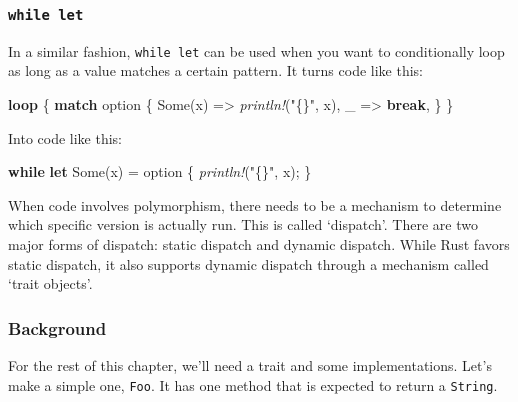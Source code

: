 \documentclass[a4paper,]{book}
\newenvironment{Shaded}{\begin{snugshade}}{\end{snugshade}}
\newcommand{\KeywordTok}[1]{\textcolor[rgb]{0.13,0.29,0.53}{\textbf{{#1}}}}
\newcommand{\ConstantTok}[1]{\textcolor[rgb]{0.00,0.00,0.00}{{#1}}}
\newcommand{\StringTok}[1]{\textcolor[rgb]{0.31,0.60,0.02}{{#1}}}
\newcommand{\PreprocessorTok}[1]{\textcolor[rgb]{0.56,0.35,0.01}{\textit{{#1}}}}
\newcommand{\NormalTok}[1]{{#1}}
\begin{document}
\subsubsection{\texorpdfstring{\texttt{while\ let}}{while let}}\label{while-let}

In a similar fashion, \texttt{while\ let} can be used when you want to
conditionally loop as long as a value matches a certain pattern. It
turns code like this:

\begin{Shaded}
\begin{Highlighting}[]
\KeywordTok{loop} \NormalTok{\{}
    \KeywordTok{match} \NormalTok{option \{}
        \ConstantTok{Some}\NormalTok{(x) => }\PreprocessorTok{println!}\NormalTok{(}\StringTok{"\{\}"}\NormalTok{, x),}
        \NormalTok{_ => }\KeywordTok{break}\NormalTok{,}
    \NormalTok{\}}
\NormalTok{\}}
\end{Highlighting}
\end{Shaded}

Into code like this:

\begin{Shaded}
\begin{Highlighting}[]
\KeywordTok{while} \KeywordTok{let} \ConstantTok{Some}\NormalTok{(x) = option \{}
    \PreprocessorTok{println!}\NormalTok{(}\StringTok{"\{\}"}\NormalTok{, x);}
\NormalTok{\}}
\end{Highlighting}
\end{Shaded}


When code involves polymorphism, there needs to be a mechanism to
determine which specific version is actually run. This is called
`dispatch'. There are two major forms of dispatch: static dispatch and
dynamic dispatch. While Rust favors static dispatch, it also supports
dynamic dispatch through a mechanism called `trait objects'.

\subsubsection{Background}\label{background}

For the rest of this chapter, we'll need a trait and some
implementations. Let's make a simple one, \texttt{Foo}. It has one
method that is expected to return a \texttt{String}.
\end{document}
